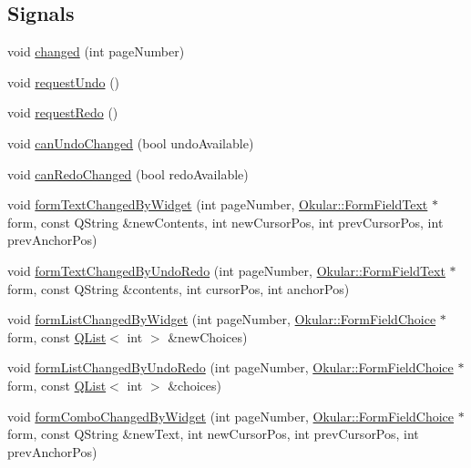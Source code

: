 \subsection*{Signals}
\begin{DoxyCompactItemize}
\item 
void \hyperlink{classFormWidgetsController_a7a0301cbe80b6d18423794448df038b0}{changed} (int page\+Number)
\item 
void \hyperlink{classFormWidgetsController_a90e5af0601c7e5efcfbf6e1b93ae5641}{request\+Undo} ()
\item 
void \hyperlink{classFormWidgetsController_a828b4d568a04cd6728bcf1d49ed5c425}{request\+Redo} ()
\item 
void \hyperlink{classFormWidgetsController_a3754d19107a1589966e38fa2d5e90556}{can\+Undo\+Changed} (bool undo\+Available)
\item 
void \hyperlink{classFormWidgetsController_a2303e4906581a81bbb54a08aa37164bf}{can\+Redo\+Changed} (bool redo\+Available)
\item 
void \hyperlink{classFormWidgetsController_afa83b700a3a1ff593dc63b085416ea20}{form\+Text\+Changed\+By\+Widget} (int page\+Number, \hyperlink{classOkular_1_1FormFieldText}{Okular\+::\+Form\+Field\+Text} $\ast$form, const Q\+String \&new\+Contents, int new\+Cursor\+Pos, int prev\+Cursor\+Pos, int prev\+Anchor\+Pos)
\item 
void \hyperlink{classFormWidgetsController_a83510071c6ada2c746f4ef289577d6ef}{form\+Text\+Changed\+By\+Undo\+Redo} (int page\+Number, \hyperlink{classOkular_1_1FormFieldText}{Okular\+::\+Form\+Field\+Text} $\ast$form, const Q\+String \&contents, int cursor\+Pos, int anchor\+Pos)
\item 
void \hyperlink{classFormWidgetsController_ab6d422dffb0d6205288da0b2bae3b733}{form\+List\+Changed\+By\+Widget} (int page\+Number, \hyperlink{classOkular_1_1FormFieldChoice}{Okular\+::\+Form\+Field\+Choice} $\ast$form, const \hyperlink{classQList}{Q\+List}$<$ int $>$ \&new\+Choices)
\item 
void \hyperlink{classFormWidgetsController_a41ab728e4ee6afd79111f710eccbdb91}{form\+List\+Changed\+By\+Undo\+Redo} (int page\+Number, \hyperlink{classOkular_1_1FormFieldChoice}{Okular\+::\+Form\+Field\+Choice} $\ast$form, const \hyperlink{classQList}{Q\+List}$<$ int $>$ \&choices)
\item 
void \hyperlink{classFormWidgetsController_a07ea26d5a5f144537941f001c8e2dd1e}{form\+Combo\+Changed\+By\+Widget} (int page\+Number, \hyperlink{classOkular_1_1FormFieldChoice}{Okular\+::\+Form\+Field\+Choice} $\ast$form, const Q\+String \&new\+Text, int new\+Cursor\+Pos, int prev\+Cursor\+Pos, int prev\+Anchor\+Pos)

\end{DoxyCompactItemize}
